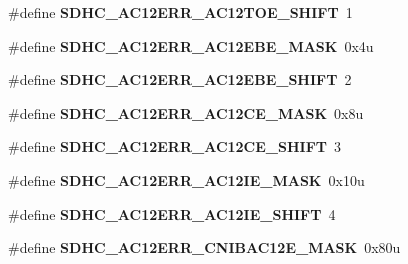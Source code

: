 \begin{DoxyCompactItemize}
\item 
\#define {\bfseries S\+D\+H\+C\+\_\+\+A\+C12\+E\+R\+R\+\_\+\+A\+C12\+T\+O\+E\+\_\+\+S\+H\+I\+FT}~1\hypertarget{group__SDHC__Register__Masks_ga9b67902a6fac916d2c9425c8262aebc5}{}\label{group__SDHC__Register__Masks_ga9b67902a6fac916d2c9425c8262aebc5}

\item 
\#define {\bfseries S\+D\+H\+C\+\_\+\+A\+C12\+E\+R\+R\+\_\+\+A\+C12\+E\+B\+E\+\_\+\+M\+A\+SK}~0x4u\hypertarget{group__SDHC__Register__Masks_ga20a7d6558b259a61499a0745f6450798}{}\label{group__SDHC__Register__Masks_ga20a7d6558b259a61499a0745f6450798}

\item 
\#define {\bfseries S\+D\+H\+C\+\_\+\+A\+C12\+E\+R\+R\+\_\+\+A\+C12\+E\+B\+E\+\_\+\+S\+H\+I\+FT}~2\hypertarget{group__SDHC__Register__Masks_gaa4872fca1b2f1ae350fcb6297e995469}{}\label{group__SDHC__Register__Masks_gaa4872fca1b2f1ae350fcb6297e995469}

\item 
\#define {\bfseries S\+D\+H\+C\+\_\+\+A\+C12\+E\+R\+R\+\_\+\+A\+C12\+C\+E\+\_\+\+M\+A\+SK}~0x8u\hypertarget{group__SDHC__Register__Masks_gabefbec3e963ccb70de1fdc5b0bb06c14}{}\label{group__SDHC__Register__Masks_gabefbec3e963ccb70de1fdc5b0bb06c14}

\item 
\#define {\bfseries S\+D\+H\+C\+\_\+\+A\+C12\+E\+R\+R\+\_\+\+A\+C12\+C\+E\+\_\+\+S\+H\+I\+FT}~3\hypertarget{group__SDHC__Register__Masks_ga7b92a5f04788ce2cc5634ebf7f604a9b}{}\label{group__SDHC__Register__Masks_ga7b92a5f04788ce2cc5634ebf7f604a9b}

\item 
\#define {\bfseries S\+D\+H\+C\+\_\+\+A\+C12\+E\+R\+R\+\_\+\+A\+C12\+I\+E\+\_\+\+M\+A\+SK}~0x10u\hypertarget{group__SDHC__Register__Masks_ga83739f9ba43d7cded35950a1e98d2caa}{}\label{group__SDHC__Register__Masks_ga83739f9ba43d7cded35950a1e98d2caa}

\item 
\#define {\bfseries S\+D\+H\+C\+\_\+\+A\+C12\+E\+R\+R\+\_\+\+A\+C12\+I\+E\+\_\+\+S\+H\+I\+FT}~4\hypertarget{group__SDHC__Register__Masks_ga3bd5a3ae0633a0ab02becdb7422fa910}{}\label{group__SDHC__Register__Masks_ga3bd5a3ae0633a0ab02becdb7422fa910}

\item 
\#define {\bfseries S\+D\+H\+C\+\_\+\+A\+C12\+E\+R\+R\+\_\+\+C\+N\+I\+B\+A\+C12\+E\+\_\+\+M\+A\+SK}~0x80u\hypertarget{group__SDHC__Register__Masks_gad096f631b95fe669726629c2c1f3fbee}{}\label{group__SDHC__Register__Masks_gad096f631b95fe669726629c2c1f3fbee}


\end{DoxyCompactItemize}
